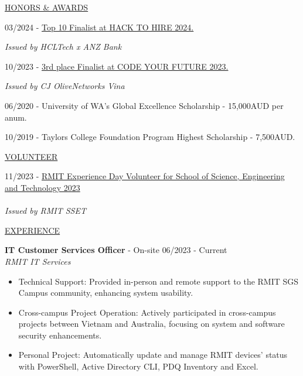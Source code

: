 \documentclass[11pt]{article}
\newcommand{\betteruline}[1]{
    \uline{#1}
}
\newcommand{\sectiontitle}[1]{
    \begingroup
        \titlebold
        \betteruline{\Large\uppercase{#1}  }
        \vspace{1.7mm}
    \endgroup
}
\newcommand{\sectioncontent}[1]{
    \begingroup
        \begin{FlushLeft}
        \vspace{-3mm}
        \sffamily\small#1
        \end{FlushLeft}
    \endgroup
    \vspace{2mm}
}
\newcommand{\job}[3]{
    \begingroup
        \textbf{\small#1} - \small#2
        \hfill\color{black!70}\small{#3}
    \endgroup
}
\newcommand{\spacevv}{
    \vspace{2mm}
}
\newcommand{\honor}[2]{
    \textcolor{black!70}{#1} - #2 \\
    \vspace{1.5mm}
}
\begin{document}
\begin{paracol}{2}
    \sectiontitle{Honors \& Awards}
    \sectioncontent {
        \vspace{1mm}
        \honor{03/2024}{
            \href{https://www.linkedin.com/in/do-le-long-an/details/honors/}
            {Top 10 Finalist at HACK TO HIRE 2024.}
        }
        \textcolor{black!70}{\textit{Issued by HCLTech x ANZ Bank}} \\
        \spacevv
        \vspace{1mm}
        \honor{10/2023}{
            \href{https://www.linkedin.com/in/do-le-long-an/details/honors/}
            {3rd place Finalist at CODE YOUR FUTURE 2023.}
        }
        \textcolor{black!70}{\textit{Issued by CJ OliveNetworks Vina}} \\
        \spacevv
        \vspace{1mm}
        \honor{06/2020}{ University of WA's Global Excellence Scholarship - 15,000AUD per anum.}
        \vspace{1mm}
        \honor{10/2019}{Taylors College Foundation Program Highest Scholarship - 7,500AUD.}
    }

    \sectiontitle{Volunteer}
    \sectioncontent{
        \vspace{1mm}
    \honor {11/2023}{\href{https://www.linkedin.com/in/do-le-long-an/details/volunteering-experiences/}{RMIT Experience Day Volunteer for School of Science, Engineering and Technology 2023}} \\
    \textcolor{black!70}{\textit{Issued by RMIT SSET}} \\
    \spacevv
    }

    \switchcolumn

    \sectiontitle{Experience}
    \sectioncontent{
        \vspace{1mm}
    \job{IT Customer Services Officer}{On-site}{06/2023 - Current} \\
      \textcolor{black!70}{\textit{RMIT IT Services}}
\vspace{1mm}
      \begin{itemize}
        \item Technical Support: Provided in-person and remote support to the RMIT SGS Campus community, enhancing system usability.
\vspace{1mm}
        \item Cross-campus Project Operation: Actively participated in cross-campus projects between Vietnam and Australia, focusing on system and software security enhancements.
\vspace{1mm}
        \item Personal Project: Automatically update and manage RMIT devices' status with PowerShell, Active Directory CLI, PDQ Inventory and Excel.
      \end{itemize}
      \spacevv
    }


\end{paracol}
\end{document}
